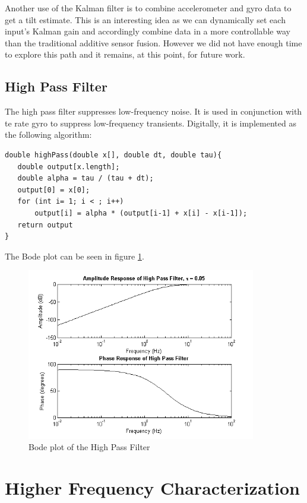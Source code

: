 \documentclass{article}
\theoremstyle{plain}
\theoremstyle{definition}
\theoremstyle{remark}
\begin{document}
Another use of the Kalman filter is to combine accelerometer and gyro data to get a tilt estimate. This is an interesting idea as we can dynamically set each input's Kalman gain and accordingly combine data in a more controllable way than the traditional additive sensor fusion. However we did not have enough time to explore this path and it remains, at this point, for future work.


\subsection{High Pass Filter}
The high pass filter suppresses low-frequency noise. It is used in conjunction with te rate gyro to suppress low-frequency transients. Digitally, it is implemented as the following algorithm:
\begin{verbatim}
double highPass(double x[], double dt, double tau){
   double output[x.length];
   double alpha = tau / (tau + dt);
   output[0] = x[0];
   for (int i= 1; i < ; i++)
       output[i] = alpha * (output[i-1] + x[i] - x[i-1]);
   return output
}
\end{verbatim}

The Bode plot can be seen in figure \ref{bode_HPF}.

\begin{figure}[hbt]
\begin{center}
\includegraphics[width = 10cm]{bode_HPF}
\caption{Bode plot of the High Pass Filter}
\label{bode_HPF}
\end{center}
\end{figure}

\clearpage



\section{Higher Frequency Characterization}
\end{document}
